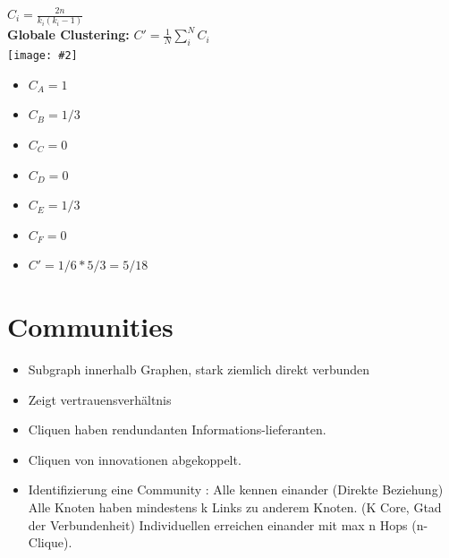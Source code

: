 \documentclass[a4paper,landscape,12pt]{scrreprt}
\newenvironment{Figure}
  {\noindent\minipage{\linewidth}}
  {\endminipage}
\newcommand{\pic}[2][ ]{
\begin{Figure}
 \texttt{[image: \#2]}
 \captionof{figure}{#1}
\end{Figure}
}
\begin{document}
\begin{multicols*}{2}
\begin{description}
\begin{itemize}
		$C_i = \frac{2n}{k_i(k_i-1)}$\\
		\textbf{Globale Clustering:} $C' = \frac{1}{N} \sum^N_i C_i$\\
		\pic{img/ccoef.png}\\
		\begin{itemize}
			\item $C_A = 1$
			\item $C_B = 1/3$
			\item $C_C = 0$
			\item $C_D = 0$
			\item $C_E = 1/3$
			\item $C_F = 0$
			\item $C' = 1/6*5/3 = 5/18$
		\end{itemize}
	\end{itemize}
\end{description}
\section{Communities} %

\begin{itemize}
	\item Subgraph innerhalb Graphen, stark ziemlich direkt verbunden
	\item Zeigt vertrauensverhältnis
	\item Cliquen haben rendundanten Informations-lieferanten.
	\item Cliquen von innovationen abgekoppelt.
	\item Identifizierung eine Community :
	\subitem Alle kennen einander (Direkte Beziehung)
	\subitem Alle Knoten haben mindestens k Links zu anderem Knoten. (K Core, Gtad der Verbundenheit)
	\subitem Individuellen erreichen einander mit max n Hops (n-Clique).
\end{itemize}


\end{multicols*}
\end{document}

